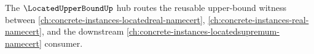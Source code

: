 The $\LocatedUpperBoundUp$ hub routes the reusable upper-bound witness between \autoref{ch:concrete-instances-locatedreal-namecert}, \autoref{ch:concrete-instances-real-namecert}, and the downstream \autoref{ch:concrete-instances-locatedsupremum-namecert} consumer.



